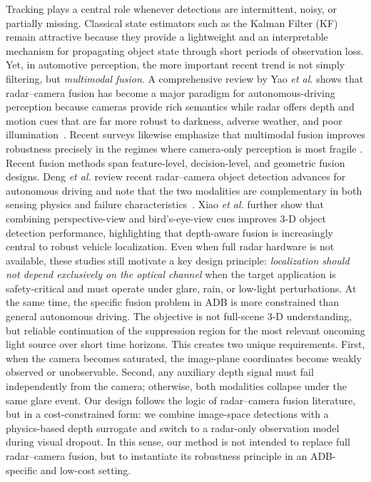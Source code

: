 \documentclass[pdflatex,sn-mathphys-num]{sn-jnl}%
\theoremstyle{thmstyleone}%
\theoremstyle{thmstyletwo}%
\theoremstyle{thmstylethree}%
\begin{document}
Tracking plays a central role whenever detections are intermittent, noisy, or partially missing. Classical state estimators such as the Kalman Filter (KF) remain attractive because they provide a lightweight and an interpretable mechanism for propagating object state through short periods of observation loss. Yet, in automotive perception, the more important recent trend is not simply filtering, but \emph{multimodal
fusion}. A comprehensive review by Yao \emph{et al.} shows that radar--camera fusion has become a major paradigm for autonomous-driving perception because cameras provide rich semantics while radar offers
depth and motion cues that are far more robust to darkness, adverse weather, and poor illumination~\cite{yao2023radar}. Recent
surveys likewise emphasize that multimodal fusion improves robustness precisely in the regimes where camera-only perception is most fragile \cite{qian2025review}.
Recent fusion methods span feature-level, decision-level, and geometric fusion designs. Deng \emph{et al.} review recent radar--camera object detection advances for autonomous driving and note that the two modalities are complementary in both sensing physics and failure characteristics~\cite{deng2025advances}. Xiao \emph{et al.} \cite{xiao2025radar} further show that combining perspective-view and bird's-eye-view cues improves 3-D object detection performance, highlighting that depth-aware fusion is increasingly central to robust vehicle localization. Even when full radar hardware is not available, these studies still motivate a key design principle: \emph{localization should not depend exclusively on the optical channel}
when the target application is safety-critical and must operate under glare, rain, or low-light perturbations.
At the same time, the specific fusion problem in ADB is more constrained than general autonomous driving. The objective is not full-scene 3-D understanding, but reliable continuation of the suppression region for
the most relevant oncoming light source over short time horizons. This creates two unique requirements. First, when the camera becomes saturated,
the image-plane coordinates become weakly observed or unobservable. Second, any auxiliary depth signal must fail independently from the camera; otherwise, both modalities collapse under the same glare event. Our design follows the logic of radar--camera fusion literature, but in a cost-constrained form: we combine image-space detections with a physics-based depth surrogate and switch to a radar-only observation model during visual dropout. In this sense, our method is not intended to replace full radar--camera fusion, but to instantiate its robustness principle in an ADB-specific and low-cost setting.
\end{document}
